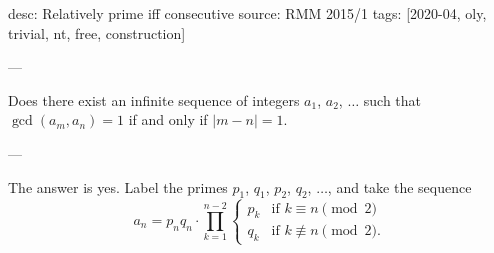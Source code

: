 desc: Relatively prime iff consecutive
source: RMM 2015/1
tags: [2020-04, oly, trivial, nt, free, construction]

---

Does there exist an infinite sequence of integers $a_1$, $a_2$, $\ldots$ such that $\gcd(a_m,a_n)=1$ if and only if $|m-n|=1$.

---

The answer is yes. Label the primes $p_1$, $q_1$, $p_2$, $q_2$, $\ldots$, and take the sequence  \[a_n=p_nq_n\cdot\prod_{k=1}^{n-2}\begin{cases}p_k&\text{if }k\equiv n\pmod2\\ q_k&\text{if }k\not\equiv n\pmod 2.\end{cases}\]
